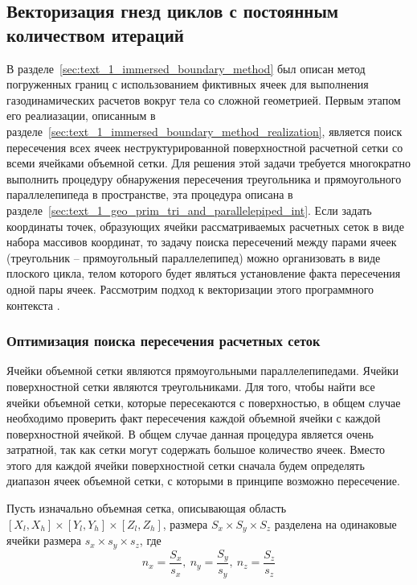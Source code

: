 \subsection{Векторизация гнезд циклов с постоянным количеством итераций}\label{sec:text_4_vec_mesh_intersect}

В разделе~\ref{sec:text_1_immersed_boundary_method} был описан метод погруженных границ с использованием фиктивных ячеек для выполнения газодинамических расчетов вокруг тела со сложной геометрией.
Первым этапом его реалиазации, описанным в разделе~\ref{sec:text_1_immersed_boundary_method_realization}, является поиск пересечения всех ячеек неструктурированной поверхностной расчетной сетки со всеми ячейками объемной сетки.
Для решения этой задачи требуется многократно выполнить процедуру обнаружения пересечения треугольника и прямоугольного параллелепипеда в пространстве, эта процедура описана в разделе~\ref{sec:text_1_geo_prim_tri_and_parallelepiped_int}.
Если задать координаты точек, образующих ячейки рассматриваемых расчетных сеток в виде набора массивов координат, то задачу поиска пересечений между парами ячеек (треугольник -- прямоугольный параллелепипед) можно организовать в виде плоского цикла, телом которого будет являться установление факта пересечения одной пары ячеек.
Рассмотрим подход к векторизации этого программного контекста \cite{Rybakov2019VecInt}.

\subsubsection{Оптимизация поиска пересечения расчетных сеток}

Ячейки объемной сетки являются прямоугольными параллелепипедами.
Ячейки поверхностной сетки являются треугольниками.
Для того, чтобы найти все ячейки объемной сетки, которые пересекаются с поверхностью, в общем случае необходимо проверить факт пересечения каждой объемной ячейки с каждой поверхностной ячейкой.
В общем случае данная процедура является очень затратной, так как сетки могут содержать большое количество ячеек.
Вместо этого для каждой ячейки поверхностной сетки сначала будем определять диапазон ячеек объемной сетки, с которыми в принципе возможно пересечение.

Пусть изначально объемная сетка, описывающая область $[X_l, X_h] \times [Y_l, Y_h] \times [Z_l, Z_h]$, размера $S_x \times S_y \times S_z$ разделена на одинаковые ячейки размера $s_x \times s_y \times s_z$, где
\begin{equation}
	n_x = \frac{S_x}{s_x}, \ n_y = \frac{S_y}{s_y}, \ n_z = \frac{S_z}{s_z}
\end{equation}

